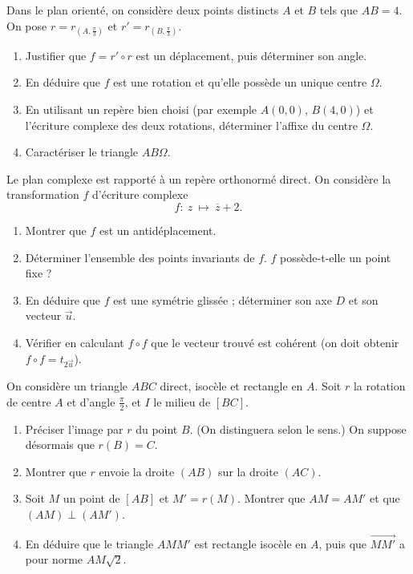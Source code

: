 Dans le plan orienté, on considère deux points distincts $A$ et $B$ tels que $AB=4$. On pose $r=r_{(A,\frac\pi3)}$ et $r'=r_{(B,\frac\pi3)}$.
\begin{enumerate}[label=\arabic*)]
\item Justifier que $f=r'\circ r$ est un déplacement, puis déterminer son angle.
\item En déduire que $f$ est une rotation et qu'elle possède un unique centre $\Omega$.
\item En utilisant un repère bien choisi (par exemple $A(0,0)$, $B(4,0)$) et l'écriture complexe des deux rotations, déterminer l'affixe du centre $\Omega$.
\item Caractériser le triangle $A B \Omega$.
\end{enumerate}

Le plan complexe est rapporté à un repère orthonormé direct. On considère la transformation $f$ d'écriture complexe
\[
f:\ z\ \longmapsto\ \overline z+2.
\]
\begin{enumerate}[label=\arabic*)]
\item Montrer que $f$ est un antidéplacement.
\item Déterminer l'ensemble des points invariants de $f$. $f$ possède-t-elle un point fixe ?
\item En déduire que $f$ est une symétrie glissée ; déterminer son axe $D$ et son vecteur $\vec u$.
\item Vérifier en calculant $f\circ f$ que le vecteur trouvé est cohérent (on doit obtenir $f\circ f=t_{2\vec u}$).
\end{enumerate}

On considère un triangle $ABC$ direct, isocèle et rectangle en $A$. Soit $r$ la rotation de centre $A$ et d'angle $\frac\pi2$, et $I$ le milieu de $[BC]$.
\begin{enumerate}[label=\arabic*)]
\item Préciser l'image par $r$ du point $B$. (On distinguera selon le sens.) On suppose désormais que $r(B)=C$.
\item Montrer que $r$ envoie la droite $(AB)$ sur la droite $(AC)$.
\item Soit $M$ un point de $[AB]$ et $M'=r(M)$. Montrer que $AM=AM'$ et que $(AM)\perp(AM')$.
\item En déduire que le triangle $A M M'$ est rectangle isocèle en $A$, puis que $\overrightarrow{MM'}$ a pour norme $AM\sqrt2$.
\end{enumerate}

